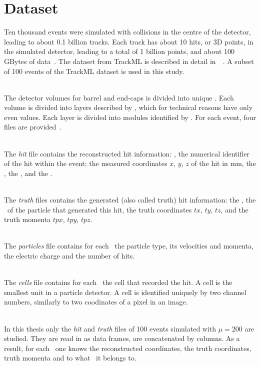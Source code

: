 \section{Dataset}

Ten thousand events were simulated with collisions in the centre of the detector, leading to about 0.1 billion tracks. Each track has about 10 hits, or 3D points, in the simulated detector, leading to a total of 1 billion points, and about 100 GBytes of data~\cite{TrackMLPPTAfter2}. The dataset from TrackML is described in detail in~\cite{TrackMLPaper}~\cite{TrackMLPaperHAL}. A subset of 100 events of the TrackML dataset is used in this study.

\ \\The detector volumes for barrel and end-caps is divided into unique \volumeID. Each volume is divided into layers described by \layerID, which for technical reasons have only even values. Each layer is divided into modules identified by \moduleID. For each event, four files are provided~\cite{TrackMLPaper}.

\ \\The \emph{hit} file contains the reconstructed hit information: \hitID, the numerical identifier of the hit within the event; the measured coordinates $x$, $y$, $z$ of the hit in mm, the \volumeID, the \layerID, and the \moduleID.

\ \\The \emph{truth} files contains the generated (also called truth) hit information: the \hitID, the \particleID~of the particle that generated this hit, the truth coordinates $tx$, $ty$, $tz$, and the truth momenta $tpx$, $tpy$, $tpz$. 

\ \\The \emph{particles} file contains for each \particleID~the particle type, its velocities and momenta, the electric charge and the number of hits.

\ \\The \emph{cells} file contains for each \hitID~the cell that recorded the hit. A cell is the smallest unit in a particle detector. A cell is identified uniquely by two channel numbers, similarly to two coodinates of a pixel in an image. 

\ \\In this thesis only the \emph{hit} and \emph{truth} files of 100 events simulated with $\mu=200$ are studied. They are read in as data frames, are concatenated by columns. As a result, for each \hitID~one knows the reconstructed coordinates, the truth coordinates, truth momenta and to what \particleID~it belongs to. 

